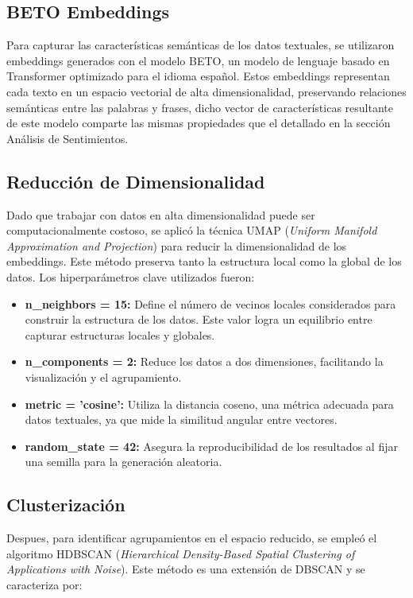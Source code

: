 \documentclass[10pt, a4paper]{article}
\begin{document}
	
	\subsection{BETO Embeddings}
	Para capturar las características semánticas de los datos textuales, se utilizaron embeddings generados con el modelo BETO, un modelo de lenguaje basado en Transformer optimizado para el idioma español. Estos embeddings representan cada texto en un espacio vectorial de alta dimensionalidad, preservando relaciones semánticas entre las palabras y frases, dicho vector de características resultante de este modelo comparte las mismas propiedades que el detallado en la sección Análisis de Sentimientos.

	\subsection{Reducción de Dimensionalidad}
	Dado que trabajar con datos en alta dimensionalidad puede ser computacionalmente costoso, se aplicó la técnica UMAP (\textit{Uniform Manifold Approximation and Projection}) para reducir la dimensionalidad de los embeddings. Este método preserva tanto la estructura local como la global de los datos. Los hiperparámetros clave utilizados fueron:
	
	\begin{itemize}
		\item \textbf{n\_neighbors = 15:} Define el número de vecinos locales considerados para construir la estructura de los datos. Este valor logra un equilibrio entre capturar estructuras locales y globales.
		\item \textbf{n\_components = 2:} Reduce los datos a dos dimensiones, facilitando la visualización y el agrupamiento.
		\item \textbf{metric = 'cosine':} Utiliza la distancia coseno, una métrica adecuada para datos textuales, ya que mide la similitud angular entre vectores.
		\item \textbf{random\_state = 42:} Asegura la reproducibilidad de los resultados al fijar una semilla para la generación aleatoria.
	\end{itemize}

	
	\subsection{Clusterización}
	Despues, para identificar agrupamientos en el espacio reducido, se empleó el algoritmo HDBSCAN (\textit{Hierarchical Density-Based Spatial Clustering of Applications with Noise}). Este método es una extensión de DBSCAN y se caracteriza por:
	
\end{document}
